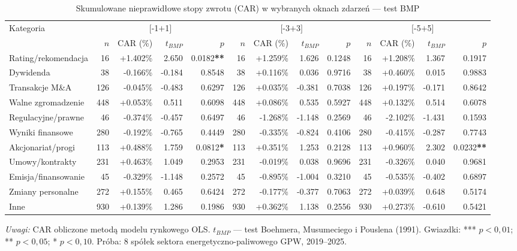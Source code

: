 \begin{table}[htbp]
\centering
\footnotesize
\caption{Skumulowane nieprawidłowe stopy zwrotu (CAR) w wybranych oknach zdarzeń — test BMP}
\label{tab:car_bmp}
\begin{tabular}{lrrrrrrrrrrrr}
\toprule
Kategoria & \multicolumn{4}{c}{$[$-1$+$1$]$} & \multicolumn{4}{c}{$[$-3$+$3$]$} & \multicolumn{4}{c}{$[$-5$+$5$]$} \\
\cmidrule(lr){2-5}\cmidrule(lr){6-9}\cmidrule(lr){10-13}
 & $n$ & CAR (\%) & $t_{BMP}$ & $p$ & $n$ & CAR (\%) & $t_{BMP}$ & $p$ & $n$ & CAR (\%) & $t_{BMP}$ & $p$ \\
\midrule
Rating/rekomendacja & 16 & +1.402\% & 2.650 & 0.0182\textbf{**} & 16 & +1.259\% & 1.626 & 0.1248 & 16 & +1.208\% & 1.367 & 0.1917 \\
Dywidenda & 38 & -0.166\% & -0.184 & 0.8548 & 38 & +0.116\% & 0.036 & 0.9716 & 38 & +0.460\% & 0.015 & 0.9883 \\
Transakcje M\&A & 126 & -0.045\% & -0.483 & 0.6297 & 126 & +0.035\% & -0.381 & 0.7038 & 126 & +0.197\% & -0.171 & 0.8642 \\
Walne zgromadzenie & 448 & +0.053\% & 0.511 & 0.6098 & 448 & +0.086\% & 0.535 & 0.5927 & 448 & +0.132\% & 0.514 & 0.6078 \\
Regulacyjne/prawne & 46 & -0.374\% & -0.457 & 0.6497 & 46 & -1.268\% & -1.148 & 0.2569 & 46 & -2.102\% & -1.431 & 0.1593 \\
Wyniki finansowe & 280 & -0.192\% & -0.765 & 0.4449 & 280 & -0.335\% & -0.824 & 0.4106 & 280 & -0.415\% & -0.287 & 0.7743 \\
Akcjonariat/progi & 113 & +0.488\% & 1.759 & 0.0812\textbf{*} & 113 & +0.351\% & 1.253 & 0.2128 & 113 & +0.960\% & 2.302 & 0.0232\textbf{**} \\
Umowy/kontrakty & 231 & +0.463\% & 1.049 & 0.2953 & 231 & -0.019\% & 0.038 & 0.9696 & 231 & -0.326\% & 0.040 & 0.9681 \\
Emisja/finansowanie & 45 & -0.329\% & -1.148 & 0.2572 & 45 & -0.895\% & -1.004 & 0.3210 & 45 & -0.535\% & -0.402 & 0.6897 \\
Zmiany personalne & 272 & +0.155\% & 0.465 & 0.6424 & 272 & -0.177\% & -0.377 & 0.7063 & 272 & +0.039\% & 0.648 & 0.5174 \\
Inne & 930 & +0.139\% & 1.286 & 0.1986 & 930 & +0.362\% & 1.138 & 0.2556 & 930 & +0.273\% & -0.610 & 0.5421 \\
\bottomrule
\end{tabular}
\begin{tablenotes}
\small \item \textit{Uwagi:} CAR obliczone metodą modelu rynkowego OLS. $t_{BMP}$ — test Boehmera, Musumeciego i Pouslena (1991). Gwiazdki: *** $p<0{,}01$; ** $p<0{,}05$; * $p<0{,}10$. Próba: 8 spółek sektora energetyczno-paliwowego GPW, 2019–2025.
\end{tablenotes}
\end{table}
